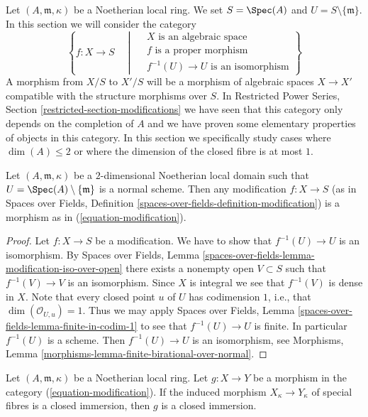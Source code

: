 \noindent
Let $(A, \mathfrak m, \kappa)$ be a Noetherian local ring. We set
$S = \Spec(A)$ and $U = S \setminus \{\mathfrak m\}$. In this section
we will consider the category
\begin{equation}
\label{equation-modification}
\left\{
f : X \longrightarrow S
\quad \middle| \quad
\begin{matrix}
X\text{ is an algebraic space}\\
f\text{ is a proper morphism}\\
f^{-1}(U) \to U\text{ is an isomorphism}
\end{matrix}
\right\}
\end{equation}
A morphism from $X/S$ to $X'/S$ will be a morphism of algebraic spaces
$X \to X'$ compatible with the structure morphisms over $S$. In
Restricted Power Series, Section \ref{restricted-section-modifications}
we have seen that this category only depends on the completion of $A$
and we have proven some elementary properties of objects in this category.
In this section we specifically study cases where
$\dim(A) \leq 2$ or where the dimension of the closed fibre is at most $1$.

\begin{lemma}
\label{lemma-modification}
Let $(A, \mathfrak m, \kappa)$ be a $2$-dimensional Noetherian
local domain such that $U = \Spec(A) \setminus \{\mathfrak m\}$
is a normal scheme. Then any modification $f : X \to S$
(as in Spaces over Fields, Definition
\ref{spaces-over-fields-definition-modification})
is a morphism as in (\ref{equation-modification}).
\end{lemma}

\begin{proof}
Let $f : X \to S$ be a modification. We have to show that
$f^{-1}(U) \to U$ is an isomorphism. By
Spaces over Fields, Lemma
\ref{spaces-over-fields-lemma-modification-iso-over-open}
there exists a nonempty open $V \subset S$ such that $f^{-1}(V) \to V$
is an isomorphism. Since $X$ is integral we see that $f^{-1}(V)$ is
dense in $X$. Note that every closed point $u$ of $U$ has codimension
$1$, i.e., that $\dim(\mathcal{O}_{U, u}) = 1$. Thus we may apply
Spaces over Fields, Lemma \ref{spaces-over-fields-lemma-finite-in-codim-1}
to see that $f^{-1}(U) \to U$ is finite. In particular $f^{-1}(U)$ is a scheme.
Then $f^{-1}(U) \to U$ is an isomorphism, see
Morphisms, Lemma \ref{morphisms-lemma-finite-birational-over-normal}.
\end{proof}

\begin{lemma}
\label{lemma-closed-immersion-on-fibre}
Let $(A, \mathfrak m, \kappa)$ be a Noetherian local ring.
Let $g : X \to Y$ be a morphism in the category (\ref{equation-modification}).
If the induced morphism $X_\kappa \to Y_\kappa$ of special fibres is
a closed immersion, then $g$ is a closed immersion.
\end{lemma}

